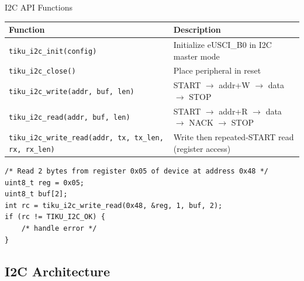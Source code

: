 \documentclass[aspectratio=169, 10pt]{beamer}
\begin{document}
\begin{frame}[fragile]{I2C API Functions}
\begin{table}
\centering
\small
\begin{tabular}{@{}lp{8cm}@{}}
\toprule
\textbf{Function} & \textbf{Description} \\
\midrule
\texttt{tiku\_i2c\_init(config)}    & Initialize eUSCI\_B0 in I2C master mode \\
\texttt{tiku\_i2c\_close()}         & Place peripheral in reset \\
\midrule
\texttt{tiku\_i2c\_write(addr, buf, len)}
    & START $\rightarrow$ addr+W $\rightarrow$ data $\rightarrow$ STOP \\
\texttt{tiku\_i2c\_read(addr, buf, len)}
    & START $\rightarrow$ addr+R $\rightarrow$ data $\rightarrow$ NACK $\rightarrow$ STOP \\
\texttt{tiku\_i2c\_write\_read(addr, tx, tx\_len, rx, rx\_len)}
    & Write then repeated-START read (register access) \\
\bottomrule
\end{tabular}
\end{table}

\vspace{0.3em}
\begin{lstlisting}[style=cstyle, title={Typical register-read pattern}]
/* Read 2 bytes from register 0x05 of device at address 0x48 */
uint8_t reg = 0x05;
uint8_t buf[2];
int rc = tiku_i2c_write_read(0x48, &reg, 1, buf, 2);
if (rc != TIKU_I2C_OK) {
    /* handle error */
}
\end{lstlisting}
\end{frame}

\subsection{I2C Architecture}
\end{document}
